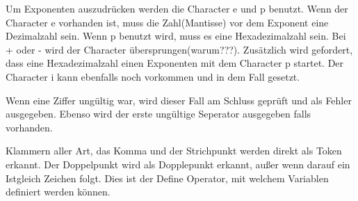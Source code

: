 Um Exponenten auszudrücken werden die Character e und p benutzt. Wenn der Character e vorhanden ist, muss die Zahl(Mantisse) vor dem Exponent eine Dezimalzahl sein. Wenn p benutzt wird, muss es eine Hexadezimalzahl sein.
Bei + oder - wird der Character übersprungen(warum???). Zusätzlich wird gefordert, dass eine Hexadezimalzahl einen Exponenten mit dem Character p startet. Der Character i kann ebenfalls noch vorkommen und in dem Fall gesetzt. 

Wenn eine Ziffer ungültig war, wird dieser Fall am Schluss geprüft und als Fehler ausgegeben. Ebenso wird der erste ungültige Seperator ausgegeben falls vorhanden.

Klammern aller Art, das Komma und der Strichpunkt werden direkt als Token erkannt.
Der Doppelpunkt wird als Dopplepunkt erkannt, außer wenn darauf ein Istgleich Zeichen folgt. Dies ist der Define Operator, mit welchem Variablen definiert werden können.

